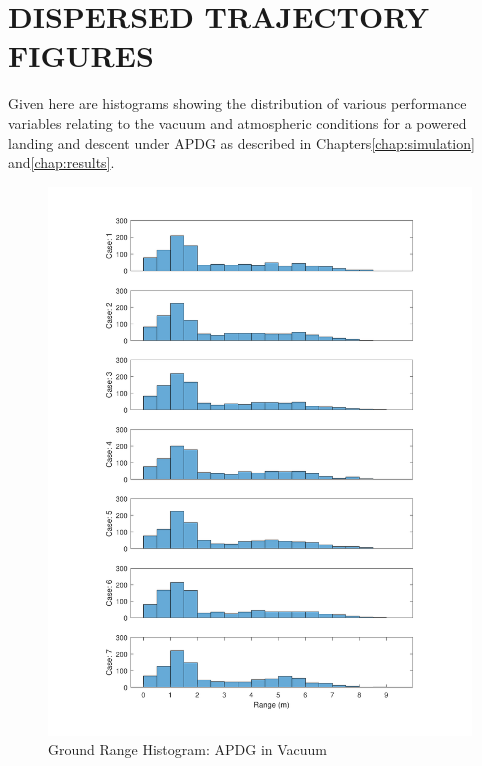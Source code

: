 \appendix
%
%
 

\chapter{DISPERSED TRAJECTORY FIGURES}

Given here are histograms showing the distribution of various performance variables relating to the vacuum and atmospheric conditions for a powered landing and descent under APDG as described in Chapters\:\ref{chap:simulation} and\:\ref{chap:results}.

\begin{figure}[H]
	\centering
	\begin{minipage}{4.3 in}
		\includegraphics[width=\linewidth]{Figures/hrngdisppowvac.pdf}
		\caption{Ground Range Histogram: APDG in Vacuum \label{fig:hrngdisppowvac} }
	\end{minipage}
\end{figure}



